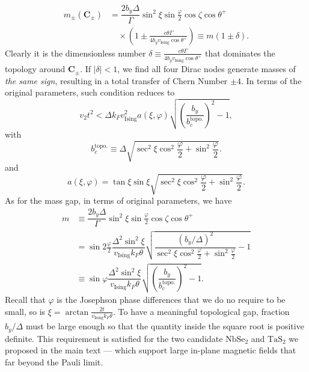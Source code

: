 \begin{subappendices}
	\begin{align}\label{topological mass gap}
		m_\pm(\bm{C}_\pm) & =\dfrac{2b_y\Delta}{\Gamma}\sin^2\xi\sin\frac{\varphi}{2}\cos\zeta\cos\theta^+\nonumber                 \\
		                  & \quad\times\left(1\pm\frac{c\theta\Gamma}{4b_yv_{\text{Ising}}\cos\theta^+}\right)\equiv m(1\pm\delta).
	\end{align}
	Clearly it is the dimensionless number $\delta\equiv\frac{c\theta\Gamma}{4b_yv_{\text{Ising}}\cos\theta^+}$ that dominates the topology around $\bm{C}_\pm$. If $|\delta|<1$, we find all four Dirac nodes generate masses of \emph{the same sign}, resulting in a total transfer of Chern Number $\pm4$. In terms of the original parameters, such condition reduces to
	\begin{equation}
		v_2t^2<\Delta k_Fv_{\text{Ising}}^2 a(\xi,\varphi)\sqrt{\left(\dfrac{b_y}{b_c^{\text{topo.}}}\right)^2-1},\label{eqn:v2_condition}
	\end{equation}
	with
	\begin{equation}\label{b_c topological}
		b_c^{\text{topo.}}\equiv\Delta\sqrt{\sec^2\xi\cos^2\frac{\varphi}{2}+\sin^2\frac{\varphi}{2}}.
	\end{equation}
	and
	\begin{equation*}
		a(\xi,\varphi)=\tan\xi\sin\xi\sqrt{\sec^2\xi\cos^2\frac{\varphi}{2}+\sin^2\frac{\varphi}{2}}.
	\end{equation*}
	As for the mass gap, in terms of original parameters, we have
	\begin{align}\label{topological mass gap (original paramter)}
		m & \equiv\dfrac{2b_y\Delta}{\Gamma}\sin^2\xi\sin\frac{\varphi}{2}\cos\zeta\cos\theta^+\nonumber                                                                                   \\
		  & =\sin2\frac{\varphi}{2}\dfrac{\Delta^2\sin^2\xi}{v_{\text{Ising}} k_F\theta}\sqrt{\dfrac{(b_y/\Delta)^2}{\sec^2\xi\cos^2\frac{\varphi}{2}+\sin^2\frac{\varphi}{2}}-1}\nonumber \\
		  & \equiv\sin\varphi\dfrac{\Delta^2\sin^2\xi}{v_{\text{Ising}} k_F\theta}\sqrt{\left(\dfrac{b_y}{b_c^{\text{topo.}}}\right)^2-1}.
	\end{align}
	Recall that $\varphi$ is the Josephson phase differences that we do no require to be small, so is $\xi=\arctan\frac{2t}{v_{\text{Ising}}k_F\theta}$. To have a meaningful topological gap, fraction $b_y/\Delta$ must be large enough so that the quantity inside the square root is positive definite. This requirement is satisfied for the two candidate $\mathrm{NbSe_2}$ and $\mathrm{TaS_2}$ we proposed in the main text --- which support large in-plane magnetic fields that far beyond the Pauli limit.


\end{subappendices}
